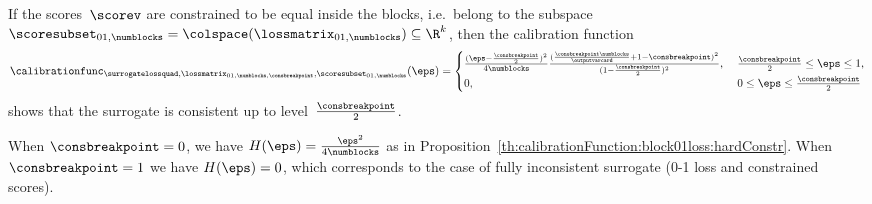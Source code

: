 \documentclass{article}
\begin{document}
\begin{proposition}
    \label{th:calibrationFunction:mixedLoss:hardConstr}
    If the scores~$\scorev$ are constrained to be equal inside the blocks, i.e.\ belong to the subspace~$\scoresubset_{01,\numblocks} = \colspace(\lossmatrix_{01,\numblocks}) \subseteq \R^k$, then the calibration function
    \[
    \calibrationfunc_{\surrogatelossquad,\lossmatrix_{01,\numblocks,\consbreakpoint},\scoresubset_{01,\numblocks}}(\eps)
    =
    \begin{cases}
    \frac{(\eps-\frac{\consbreakpoint}{2})^2}{4\numblocks}\frac{(\frac{\consbreakpoint \numblocks}{\outputvarcard}+1-\consbreakpoint)^2}{(1-\frac{\consbreakpoint}{2})^2}, \;&\text{$\frac{\consbreakpoint}{2} \leq \eps \leq 1$}, \\
    0,\;&\text{$0\leq \eps \leq \frac{\consbreakpoint}{2}$}
    \end{cases}
    \]
    shows that the surrogate is consistent up to level~$\frac{\consbreakpoint}{2}$.
\end{proposition}
When $\consbreakpoint=0$, we have $H(\eps) = \frac{\eps^2}{4 \numblocks}$ as in Proposition~\ref{th:calibrationFunction:block01loss:hardConstr}.
When $\consbreakpoint = 1$ we have $H(\eps) = 0$, which corresponds to the case of fully inconsistent surrogate (0-1 loss and constrained scores).
\end{document}
